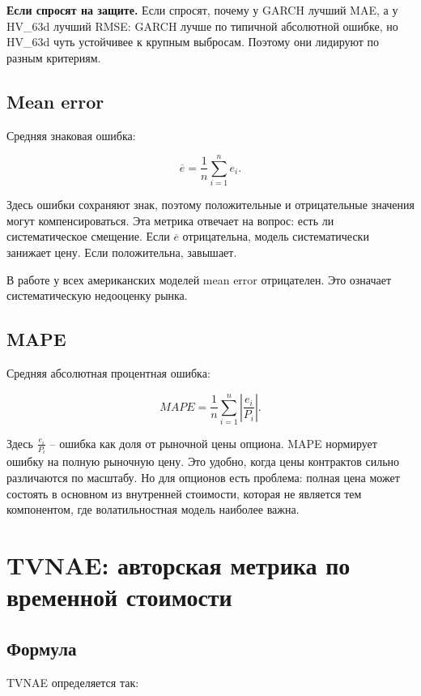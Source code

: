 \documentclass[11pt,a4paper]{article}
\newcommand{\answer}[1]{%
  \vspace{0.15em}
  \noindent\colorbox{softgreen}{%
    \parbox{\dimexpr\linewidth-2\fboxsep\relax}{\textbf{Если спросят на защите.} #1}%
  }\vspace{0.2em}
}
\begin{document}
\answer{Если спросят, почему у GARCH лучший MAE, а у HV\_63d лучший RMSE: GARCH лучше по типичной абсолютной ошибке, но HV\_63d чуть устойчивее к крупным выбросам. Поэтому они лидируют по разным критериям.}

\subsection{Mean error}

Средняя знаковая ошибка:

\begin{equation}
\overline{e} =
\frac{1}{n}
\sum_{i=1}^{n}
e_i.
\end{equation}

Здесь ошибки сохраняют знак, поэтому положительные и отрицательные значения могут компенсироваться. Эта метрика отвечает на вопрос: есть ли систематическое смещение. Если $\overline{e}$ отрицательна, модель систематически занижает цену. Если положительна, завышает.

В работе у всех американских моделей mean error отрицателен. Это означает систематическую недооценку рынка.

\subsection{MAPE}

Средняя абсолютная процентная ошибка:

\begin{equation}
MAPE =
\frac{1}{n}
\sum_{i=1}^{n}
\left|
\frac{e_i}{P_i}
\right|.
\end{equation}

Здесь $\frac{e_i}{P_i}$ -- ошибка как доля от рыночной цены опциона. MAPE нормирует ошибку на полную рыночную цену. Это удобно, когда цены контрактов сильно различаются по масштабу. Но для опционов есть проблема: полная цена может состоять в основном из внутренней стоимости, которая не является тем компонентом, где волатильностная модель наиболее важна.

\section{TVNAE: авторская метрика по временной стоимости}

\subsection{Формула}

TVNAE определяется так:
\end{document}
